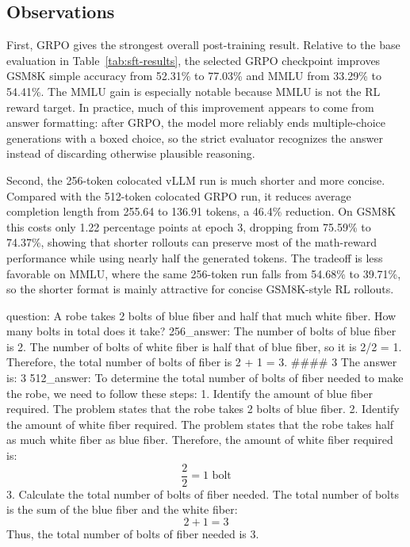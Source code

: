 \documentclass[11pt]{article}
\begin{document}
\subsection{Observations}
First, GRPO gives the strongest overall post-training result. Relative to the base evaluation in Table~\ref{tab:sft-results}, the selected GRPO checkpoint improves GSM8K simple accuracy from 52.31\% to 77.03\% and MMLU from 33.29\% to 54.41\%. The MMLU gain is especially notable because MMLU is not the RL reward target. In practice, much of this improvement appears to come from answer formatting: after GRPO, the model more reliably ends multiple-choice generations with a boxed choice, so the strict evaluator recognizes the answer instead of discarding otherwise plausible reasoning.

Second, the 256-token colocated vLLM run is much shorter and more concise. Compared with the 512-token colocated GRPO run, it reduces average completion length from 255.64 to 136.91 tokens, a 46.4\% reduction. On GSM8K this costs only 1.22 percentage points at epoch 3, dropping from 75.59\% to 74.37\%, showing that shorter rollouts can preserve most of the math-reward performance while using nearly half the generated tokens. The tradeoff is less favorable on MMLU, where the same 256-token run falls from 54.68\% to 39.71\%, so the shorter format is mainly attractive for concise GSM8K-style RL rollouts.

\begin{answerbox}
question: A robe takes 2 bolts of blue fiber and half that much white fiber. How many bolts in total does it take?
256_answer: The number of bolts of blue fiber is 2. The number of bolts of white fiber is half that of blue fiber, so it is 2/2 = 1. Therefore, the total number of bolts of fiber is 2 + 1 = 3. #### 3 The answer is: 3
512_answer: To determine the total number of bolts of fiber needed to make the robe, we need to follow these steps: 1. Identify the amount of blue fiber required. The problem states that the robe takes 2 bolts of blue fiber. 2. Identify the amount of white fiber required. The problem states that the robe takes half as much white fiber as blue fiber. Therefore, the amount of white fiber required is: \[ \frac{2}{2} = 1 \text{ bolt} \] 3. Calculate the total number of bolts of fiber needed. The total number of bolts is the sum of the blue fiber and the white fiber: \[ 2 + 1 = 3 \] Thus, the total number of bolts of fiber needed is \(\boxed{3}\).
\end{answerbox}
\end{document}
